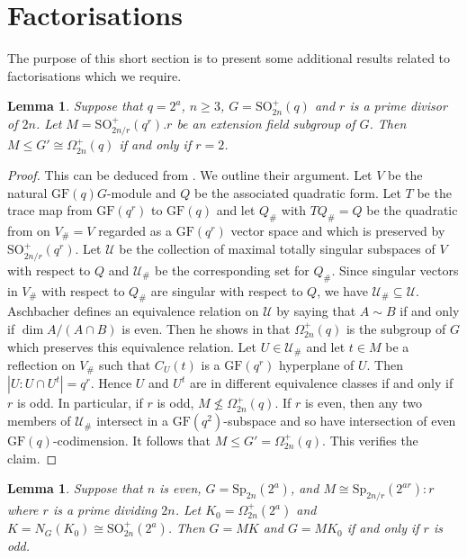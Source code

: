 \documentclass[12pt]{amsart}
\newtheorem{lemma}[theorem]{Lemma}
\theoremstyle{remark}
\theoremstyle{notation}
\theoremstyle{definition}
\newcommand{\GF}{\mathrm{GF}}
\newcommand{\Sp}{\mathrm{Sp}}
\newcommand{\0}{\emptyset}
\newcommand{\SO}{\mathrm{SO}}
\begin{document}
\section{Factorisations}\label{sec:Factorisations}

The purpose of this short section is to present some additional results related to factorisations which we require.

\begin{lemma}\label{lem: in omega} Suppose that $q=2^a$, $n \ge 3$, $G= \SO_{2n}^+(q)$ and $r$ is a prime divisor of $2n$.  Let $M= \SO_{2n/r}^+(q^r).r$ be an extension field subgroup of $G$. Then $M \le G' \cong \Omega_{2n}^+(q)$  if and only if $r=2$.
\end{lemma}

\begin{proof} This can be deduced from \cite[Proposition 4.3.14]{KleidmanLiebeck}. We outline their argument.  Let  $V$ be the natural $\GF(q)G$-module and $Q$ be the associated quadratic form.  Let $T$ be the trace map from $\GF(q^r)$ to $\GF(q)$ and let $Q_\#$ with $TQ_\#=Q$ be the quadratic from on $V_\#=V$ regarded as a $\GF(q^r)$ vector space and which is preserved by $\SO_{2n/r}^+(q^r)$. Let $\mathcal U$ be the collection of maximal totally singular subspaces of $V$ with respect to $Q$ and $\mathcal U_\#$ be the corresponding set for $Q_\#$. Since singular vectors in $V_\#$ with respect to $Q_\#$ are singular with respect to $Q$, we have $\mathcal U_\# \subseteq \mathcal U$. Aschbacher \cite[23.13]{AschbacherFG} defines an equivalence relation on $\mathcal U$ by saying that $ A\sim B$ if and only if $\dim A/(A\cap B)$ is even. Then he shows in \cite[23.14]{AschbacherFG} that $\Omega_{2n}^+(q)$ is the subgroup of $G$ which preserves this equivalence relation. Let $U \in \mathcal U_\#$ and let $t \in M$ be a reflection on $V_\#$ such that $C_U(t)$ is a $\GF(q^r)$ hyperplane of $U$. Then $|U:U \cap U^t|= q^{r}$. Hence $U$ and $U^t$ are in different equivalence classes if and only if $r$ is odd.  In particular, if $r$ is odd, $M \not \le \Omega_{2n}^+(q)$.   If $r$ is even, then any two members of $\mathcal U_\#$ intersect in a $\GF(q^2)$-subspace and so have intersection of even $\GF(q)$-codimension. It follows that $M \le G'=\Omega_{2n}^+(q)$. This verifies the claim.
\end{proof}





  \begin{lemma}\label{lem:Sp fatorisations1}
  Suppose that $n$ is even, $G=\Sp_{2n}(2^a)$, and $M \cong \Sp_{2n/r}(2^{ar}){:}r$ where $r$ is a prime dividing $2n$. Let $K_0=\Omega_{2n}^+(2^a)$ and $K= N_G(K_0) \cong \SO_{2n}^+(2^a)$. Then $G= MK$ and $G=MK_0$ if and only if $r$ is odd.
  \end{lemma}
\end{document}
